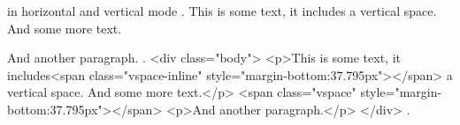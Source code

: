 \vspace{} in horizontal and vertical mode
.
This is some text, it includes\vspace{1cm} a vertical space. And some more text.

\vspace{1cm}
And another paragraph.
.
<div class="body">
<p>This is some text, it includes<span class="vspace-inline" style="margin-bottom:37.795px"></span> a vertical space. And some more text.</p>
<span class="vspace" style="margin-bottom:37.795px"></span>
<p>And another paragraph.</p>
</div>
.
